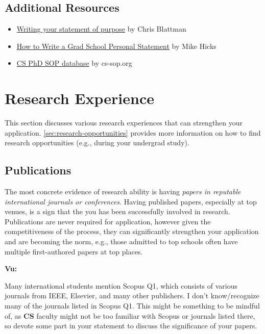 \documentclass[oneside,11pt,dvipsnames]{book}
\newenvironment{commentbox}[1][]{
  \small
  \begin{mybox}
    {\small \textbf{#1}}
  }{
  \end{mybox}
}
\begin{document}
\subsection*{Additional Resources}
\begin{itemize}
    \item \href{https://chrisblattman.com/blog/2022/01/11/}{Writing your statement of purpose} by Chris Blattman
  \item \href{http://www.pl-enthusiast.net/2022/10/03/how-to-write-a-grad-school-personal-statement/}{How to Write a Grad School Personal Statement} by Mike Hicks
  \item     \href{https://cs-sop.notion.site/cs-sop/CS-PhD-Statements-of-Purpose-df39955313834889b7ac5411c37b958d?p=f5d5980a71524ebaa4e6ae57266b847c&pm=s}{CS PhD SOP database} by cs-sop.org
\end{itemize}


\section{Research Experience}\label{sec:research-experience}

This section discusses various research experiences that can strengthen your application.
\autoref{sec:research-opportunities} provides more information on how to find research opportunities (e.g., during your undergrad study).

\subsection{Publications} The most concrete evidence of research ability is having \emph{papers in reputable international journals or conferences}.
Having published papers, especially at top venues, is a sign that the you has been successfully involved in research. Publications are never required for application, however given the competitiveness of the process, they can significantly strengthen your application and are becoming the norm, e.g., those admitted to top schools often have multiple first-authored papers at top places.

\begin{commentbox}[Vu:]
  Many international students mention Scopus Q1, which consists of various journals from IEEE, Elsevier, and many other publishers.  I don't know/recognize many of the journals listed in Scopus Q1. This might be something to be mindful of, as \textbf{CS} faculty might not be too familiar with Scopus or journals listed there, so devote some part in your statement to discuss the significance of your papers.
\end{commentbox}
\end{document}

